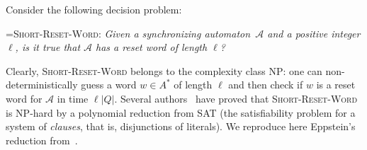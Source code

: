 \documentclass{irmaart}
\newcommand{\san}{synchronizing au\-tom\-a\-ton}
\begin{document}
Consider the following decision
problem:

\smallskip

\hangindent=\parindent \noindent\textsc{Short-Reset-Word:}
\emph{Given a \san\ $\mathcal{A}$ and a positive integer $\ell$,
is it true that $\mathcal{A}$ has a reset word of length $\ell$?}

\smallskip

Clearly, \textsc{Short-Reset-Word} belongs to the complexity class
\textsf{NP}: one can non-deterministically guess a word $w\in A^*$
of length $\ell$ and then check if $w$ is a reset word for
$\mathcal{A}$ in time $\ell|Q|$. Several
authors~\cite{Rystsov:1980,Eppstein:1990,Goralcik&Koubek:1995,Salomaa:2003,Samotij:2007}
have proved that \textsc{Short-Reset-Word} is \textsf{NP}-hard by
a polynomial reduction from \textsc{SAT} (the satisfiability
problem for a system of \emph{clauses}, that is, disjunctions of
literals). We reproduce here Eppstein's reduction
from~\cite{Eppstein:1990}.
\end{document}
